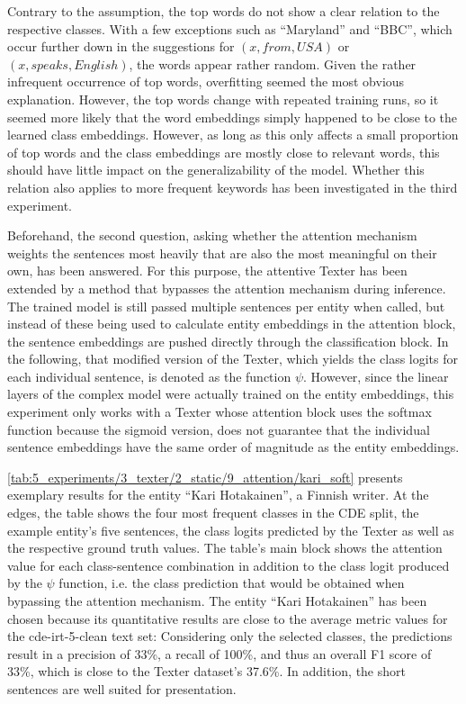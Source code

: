 Contrary to the assumption, the top words do not show a clear relation to the respective classes. With a few exceptions such as ``Maryland'' and ``BBC'', which occur further down in the suggestions for $(x, from, USA)$ or $(x, speaks, English)$, the words appear rather random. Given the rather infrequent occurrence of top words, overfitting seemed the most obvious explanation. However, the top words change with repeated training runs, so it seemed more likely that the word embeddings simply happened to be close to the learned class embeddings. However, as long as this only affects a small proportion of top words and the class embeddings are mostly close to relevant words, this should have little impact on the generalizability of the model. Whether this relation also applies to more frequent keywords has been investigated in the third experiment.

Beforehand, the second question, asking whether the attention mechanism weights the sentences most heavily that are also the most meaningful on their own, has been answered. For this purpose, the attentive Texter has been extended by a method that bypasses the attention mechanism during inference. The trained model is still passed multiple sentences per entity when called, but instead of these being used to calculate entity embeddings in the attention block, the sentence embeddings are pushed directly through the classification block. In the following, that modified version of the Texter, which yields the class logits for each individual sentence, is denoted as the function $\psi$. However, since the linear layers of the complex model were actually trained on the entity embeddings, this experiment only works with a Texter whose attention block uses the softmax function because the sigmoid version, does not guarantee that the individual sentence embeddings have the same order of magnitude as the entity embeddings.

\autoref{tab:5_experiments/3_texter/2_static/9_attention/kari_soft} presents exemplary results for the entity ``Kari Hotakainen'', a Finnish writer. At the edges, the table shows the four most frequent classes in the CDE split, the example entity's five sentences, the class logits predicted by the Texter as well as the respective ground truth values. The table's main block shows the attention value for each class-sentence combination in addition to the class logit produced by the $\psi$ function, i.e. the class prediction that would be obtained when bypassing the attention mechanism. The entity ``Kari Hotakainen'' has been chosen because its quantitative results are close to the average metric values for the cde-irt-5-clean text set: Considering only the selected classes, the predictions result in a precision of 33\%, a recall of 100\%, and thus an overall F1 score of 33\%, which is close to the Texter dataset's 37.6\%. In addition, the short sentences are well suited for presentation.

